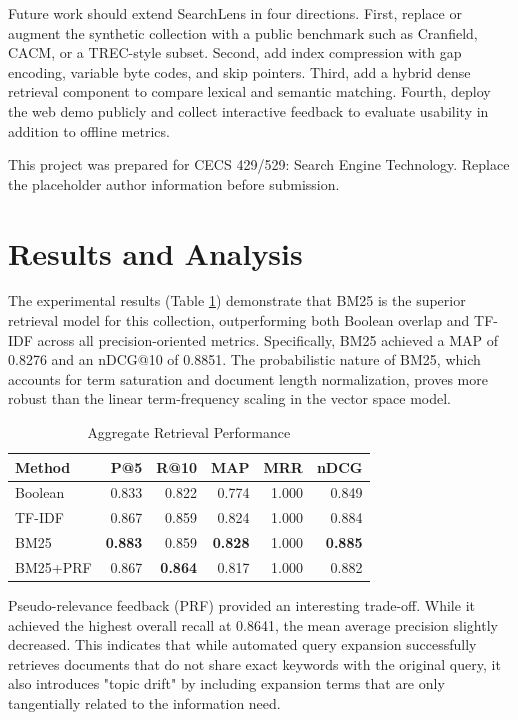 \documentclass[sigconf,nonacm]{acmart}
\begin{document}
Future work should extend SearchLens in four directions. First, replace or augment the synthetic collection with a public benchmark such as Cranfield, CACM, or a TREC-style subset. Second, add index compression with gap encoding, variable byte codes, and skip pointers. Third, add a hybrid dense retrieval component to compare lexical and semantic matching. Fourth, deploy the web demo publicly and collect interactive feedback to evaluate usability in addition to offline metrics.

\begin{acks}
This project was prepared for CECS 429/529: Search Engine Technology. Replace the placeholder author information before submission.
\end{acks}




\section{Results and Analysis}
The experimental results (Table \ref{tab:results}) demonstrate that BM25 is the superior retrieval model for this collection, outperforming both Boolean overlap and TF-IDF across all precision-oriented metrics. Specifically, BM25 achieved a MAP of 0.8276 and an nDCG@10 of 0.8851. The probabilistic nature of BM25, which accounts for term saturation and document length normalization, proves more robust than the linear term-frequency scaling in the vector space model.

\begin{table}[h]
\centering
\caption{Aggregate Retrieval Performance}
\label{tab:results}
\begin{tabular}{lrrrrr}
\toprule
Method & P@5 & R@10 & MAP & MRR & nDCG \\
\midrule
Boolean & 0.833 & 0.822 & 0.774 & 1.000 & 0.849 \\
TF-IDF  & 0.867 & 0.859 & 0.824 & 1.000 & 0.884 \\
BM25    & \textbf{0.883} & 0.859 & \textbf{0.828} & 1.000 & \textbf{0.885} \\
BM25+PRF & 0.867 & \textbf{0.864} & 0.817 & 1.000 & 0.882 \\
\bottomrule
\end{tabular}
\end{table}

Pseudo-relevance feedback (PRF) provided an interesting trade-off. While it achieved the highest overall recall at 0.8641, the mean average precision slightly decreased. This indicates that while automated query expansion successfully retrieves documents that do not share exact keywords with the original query, it also introduces "topic drift" by including expansion terms that are only tangentially related to the information need.
\end{document}
